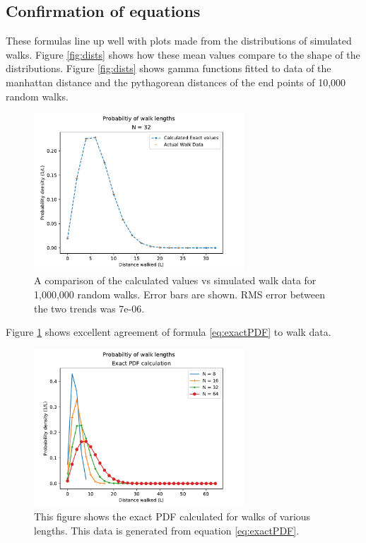  	\subsection{Confirmation of equations}
	These formulas line up well with plots made from the distributions of simulated walks. 
	Figure \ref{fig:dists} shows how these mean values compare to the shape of the distributions. Figure \ref{fig:dists} shows gamma functions fitted to data of the manhattan distance and the pythagorean distances of the end points of 10,000 random walks. 
	\begin{figure}
	 	\centering
	 	\includegraphics[width = 0.7\textwidth]{figs/calculatedvssimulated.pdf}
	 	\caption{A comparison of the calculated values vs simulated walk data for 1,000,000 random walks. Error bars are shown. RMS error between the two trends was 7e-06. }
	 	\label{fig:exactproof}
	 	\end{figure}
	 	Figure \ref{fig:exactproof} shows excellent agreement of formula \ref{eq:exactPDF} to walk data. 
	 	
	 	
	 	\begin{figure}
	 	\centering
	 	\includegraphics[width = 0.7\textwidth]{figs/exactPDFdemo.pdf}
	 	\caption{This figure shows the exact PDF calculated for walks of various lengths. This data is generated from equation \ref{eq:exactPDF}.}
	 	\end{figure}
	 	
